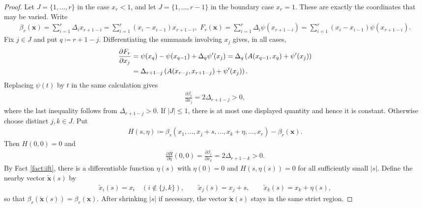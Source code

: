\documentclass[10pt,a4paper]{article}
\begin{document}
\begin{proof}
Let $J=\{1,\ldots,r\}$ in the case $x_r<1$, and let $J=\{1,\ldots,r-1\}$ in the boundary case $x_r=1$.  These are exactly the coordinates that may be varied.  Write
\begin{align}\label{eq:threshold-Fr-asymptotic}
  \beta_r(\mathbf{x})=\sum_{i=1}^r \Delta_i x_{r+1-i}=\sum_{i=1}^r (x_i-x_{i-1}) x_{r+1-i},\,\,
  F_r(\mathbf{x})=\sum_{i=1}^r \Delta_i\psi(x_{r+1-i})=\sum_{i=1}^r (x_i-x_{i-1})\psi(x_{r+1-i}).
\end{align}
Fix $j\in J$ and put $q\coloneqq r+1-j$.  Differentiating the summands involving $x_j$ gives, in all cases,
\begin{align}\label{eq:Fr-partial}
  \frac{\partial F_r}{\partial x_j}&=\psi(x_q)-\psi(x_{q-1})+\Delta_q\psi'(x_j)
  =\Delta_q\left(A(x_{q-1},x_q)+\psi'(x_j)\right)\notag\\&=\Delta_{r+1-j}\left(A(x_{r-j},x_{r+1-j})+\psi'(x_j)\right).
\end{align}
Replacing $\psi(t)$ by $t$ in the same calculation gives
\begin{align}\label{eq:betar-partial}
  \frac{\partial \beta_r}{\partial x_j}=2\Delta_{r+1-j}>0,
\end{align}
where the last inequality follows from  $\Delta_{r+1-j}>0$. If $|J|\le1$, there is at most one displayed quantity and hence it is constant.  Otherwise choose distinct $j,k\in J$.  Put
\begin{align*}
  H(s,\eta)\coloneqq
  \beta_r(x_1,\ldots,x_j+s,\ldots,x_k+\eta,\ldots,x_r)-\beta_r(\mathbf{x}).
\end{align*}
Then $H(0,0)=0$ and
\begin{align*}
  \frac{\partial H}{\partial\eta}(0,0)=\frac{\partial\beta_r}{\partial x_k}
  =2\Delta_{r+1-k}>0.
\end{align*}
By Fact \ref{fact:ift}, there is a differentiable function $\eta(s)$ with
$\eta(0)=0$ and $H(s,\eta(s))=0$ for all sufficiently small $|s|$.  Define the
nearby vector $\widetilde{\mathbf{x}}(s)$ by
\begin{align*}
  \widetilde{x}_i(s)=x_i\quad(i\notin\{j,k\}),\qquad
  \widetilde{x}_j(s)=x_j+s,\qquad
  \widetilde{x}_k(s)=x_k+\eta(s),
\end{align*}
so that
$
  \beta_r(\widetilde{\mathbf{x}}(s))=\beta_r(\mathbf{x}).
$
After shrinking $|s|$ if necessary, the vector $\widetilde{\mathbf{x}}(s)$ stays in the
same strict region.


\end{proof}
\end{document}
